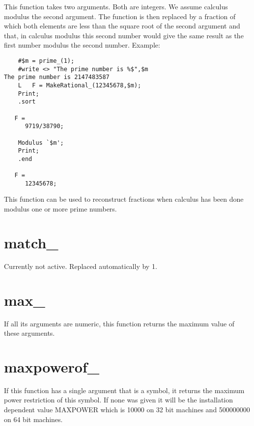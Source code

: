 \noindent This function takes two arguments. Both are integers. We assume 
calculus modulus the second argument. The function is then replaced by a 
fraction of which both elements are less than the square root of the second 
argument and that, in calculus modulus this second number would give the 
same result as the first number modulus the second number. Example:
\begin{verbatim}
    #$m = prime_(1);
    #write <> "The prime number is %$",$m
The prime number is 2147483587
    L	F = MakeRational_(12345678,$m);
    Print;
    .sort

   F =
      9719/38790;

    Modulus `$m';
    Print;
    .end

   F =
      12345678;
\end{verbatim}
\noindent This function can be used to reconstruct fractions when calculus 
has been done modulus one or more prime numbers.


\section{match\_}
\label{funmatch}
\noindent Currently not active. Replaced automatically by 1.


\section{max\_}
\label{funmax}
\noindent If all its arguments are numeric, this function returns 
the maximum value of these arguments.


\section{maxpowerof\_}
\label{funmaxpowerof}
\noindent If this function has a single argument that is a symbol, it 
returns the maximum power restriction of this symbol. If none was given it 
will be the installation dependent value MAXPOWER which is 10000 on 
32 bit machines and 500000000 on 64 bit 
machines.


